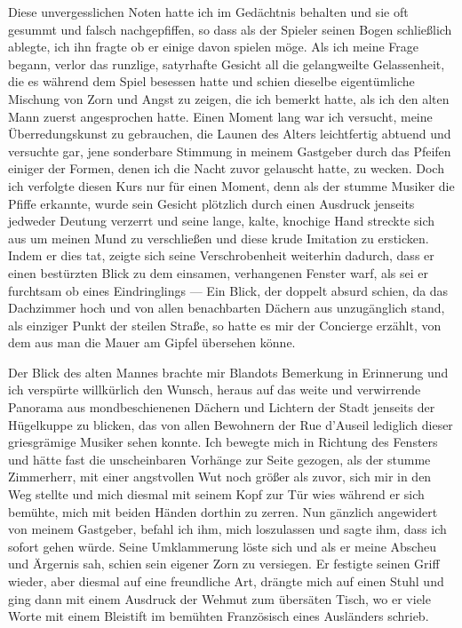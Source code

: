 \documentclass[a4paper]{memoir}
\begin{document}
Diese unvergesslichen Noten hatte ich im Gedächtnis behalten und sie oft gesummt und falsch nachgepfiffen, so dass als der Spieler seinen Bogen schließlich ablegte, ich ihn fragte ob er einige davon spielen möge. Als ich meine Frage begann, verlor das runzlige, satyrhafte Gesicht all die gelangweilte Gelassenheit, die es während dem Spiel besessen hatte und schien dieselbe eigentümliche Mischung von Zorn und Angst zu zeigen, die ich bemerkt hatte, als ich den alten Mann zuerst angesprochen hatte. Einen Moment lang war ich versucht, meine Überredungskunst zu gebrauchen, die Launen des Alters leichtfertig abtuend und versuchte gar, jene sonderbare Stimmung in meinem Gastgeber durch das Pfeifen einiger der Formen, denen ich die Nacht zuvor gelauscht  hatte, zu wecken. Doch ich verfolgte diesen Kurs nur für einen Moment, denn als der stumme Musiker die Pfiffe erkannte, wurde sein Gesicht plötzlich durch einen Ausdruck jenseits jedweder Deutung verzerrt und seine lange, kalte, knochige Hand streckte sich aus um meinen Mund zu verschließen und diese krude Imitation zu ersticken. Indem er dies tat, zeigte sich seine Verschrobenheit weiterhin dadurch, dass er einen bestürzten Blick zu dem einsamen, verhangenen Fenster warf, als sei er furchtsam ob eines Eindringlings --- Ein Blick, der doppelt absurd schien, da das Dachzimmer hoch und von allen benachbarten Dächern aus unzugänglich stand, als einziger Punkt der steilen Straße, so hatte es mir der Concierge erzählt, von dem aus man die Mauer am Gipfel übersehen könne.

Der Blick des alten Mannes brachte mir Blandots Bemerkung in Erinnerung und ich verspürte willkürlich den Wunsch, heraus auf das weite und verwirrende Panorama aus mondbeschienenen Dächern und Lichtern der Stadt jenseits der Hügelkuppe zu blicken, das von allen Bewohnern der Rue d'Auseil lediglich dieser griesgrämige Musiker sehen konnte. Ich bewegte mich in Richtung des Fensters und hätte fast die unscheinbaren Vorhänge zur Seite gezogen, als der stumme Zimmerherr, mit einer angstvollen Wut noch größer als zuvor, sich mir in den Weg stellte und mich diesmal mit seinem Kopf zur Tür wies während er sich bemühte, mich mit beiden Händen dorthin zu zerren. Nun gänzlich angewidert von meinem Gastgeber, befahl ich ihm, mich loszulassen und sagte ihm, dass ich sofort gehen würde. Seine Umklammerung löste sich und als er meine Abscheu und Ärgernis sah, schien sein eigener Zorn zu versiegen. Er festigte seinen Griff wieder, aber diesmal auf eine freundliche Art, drängte mich auf einen Stuhl und ging dann mit einem Ausdruck der Wehmut zum übersäten Tisch, wo er viele Worte mit einem Bleistift im bemühten Französisch eines Ausländers schrieb.
\end{document}
